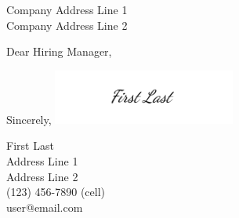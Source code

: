 \documentclass{letter}
\begin{document}
\begin{letter}
    {Company Address Line 1\\
     Company Address Line 2
    }

\opening{Dear Hiring Manager,}

\lipsum[1-3]

\closing{Sincerely,
\includegraphics[width=6cm]{signature.png}
}

First Last\\
Address Line 1\\
Address Line 2\\
(123) 456-7890 (cell)\\user@email.com

\end{letter}
\end{document}
